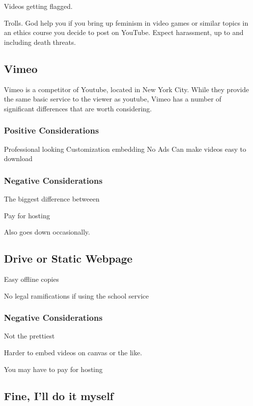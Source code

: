\documentclass[sigconf]{acmart}
\begin{document}
Videos getting flagged.

Trolls.  God help you if you bring up feminism in video games or similar topics in an ethics course you decide to post on YouTube.  Expect harassment, up to and including death threats. %

\subsection{Vimeo}
Vimeo is a competitor of Youtube, located in New York City.
While they provide the same basic service to the viewer as youtube, Vimeo has a number of significant differences that are worth considering.

\subsubsection{Positive Considerations}
Professional looking
Customization embedding
No Ads
Can make videos easy to download

\subsubsection{Negative Considerations}
The biggest difference betweeen 



Pay for hosting

Also goes down occasionally.

\subsection{Drive or Static Webpage}

Easy offline copies

No legal ramifications if using the school service

\subsubsection{Negative Considerations}
Not the prettiest

Harder to embed videos on canvas or the like.

You may have to pay for hosting




\subsection{Fine, I'll do it myself}
\end{document}
